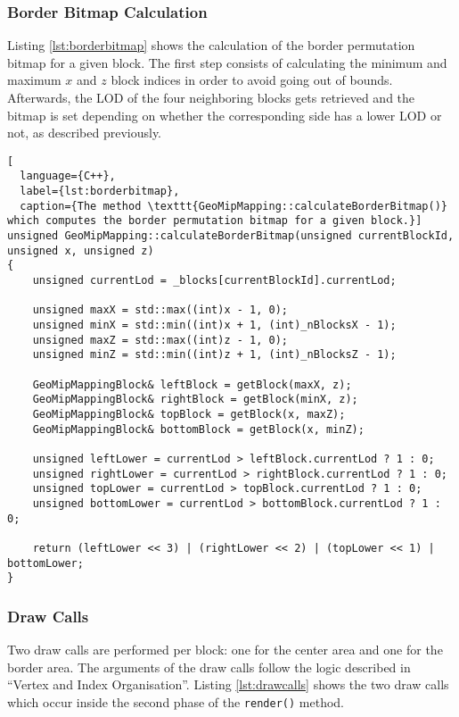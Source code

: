 \subsubsection{Border Bitmap Calculation}
Listing \ref{lst:borderbitmap} shows the calculation of the border permutation bitmap for a given block.
The first step consists of calculating the minimum and maximum $x$ and $z$ block indices
in order to avoid going out of bounds. Afterwards, the LOD of the four neighboring blocks
gets retrieved and the bitmap is set depending on whether the corresponding side 
has a lower LOD or not, as described previously.
\begin{lstlisting}[
  language={C++},
  label={lst:borderbitmap},
  caption={The method \texttt{GeoMipMapping::calculateBorderBitmap()} which computes the border permutation bitmap for a given block.}]
unsigned GeoMipMapping::calculateBorderBitmap(unsigned currentBlockId, unsigned x, unsigned z)
{
    unsigned currentLod = _blocks[currentBlockId].currentLod;

    unsigned maxX = std::max((int)x - 1, 0);
    unsigned minX = std::min((int)x + 1, (int)_nBlocksX - 1);
    unsigned maxZ = std::max((int)z - 1, 0);
    unsigned minZ = std::min((int)z + 1, (int)_nBlocksZ - 1);

    GeoMipMappingBlock& leftBlock = getBlock(maxX, z);
    GeoMipMappingBlock& rightBlock = getBlock(minX, z);
    GeoMipMappingBlock& topBlock = getBlock(x, maxZ);
    GeoMipMappingBlock& bottomBlock = getBlock(x, minZ);

    unsigned leftLower = currentLod > leftBlock.currentLod ? 1 : 0;
    unsigned rightLower = currentLod > rightBlock.currentLod ? 1 : 0;
    unsigned topLower = currentLod > topBlock.currentLod ? 1 : 0;
    unsigned bottomLower = currentLod > bottomBlock.currentLod ? 1 : 0;

    return (leftLower << 3) | (rightLower << 2) | (topLower << 1) | bottomLower;
}
\end{lstlisting}


\subsubsection{Draw Calls} 
Two draw calls are performed per block: one for the center area and one for the border area.
The arguments of the draw calls follow the logic described in ``Vertex and Index Organisation''.
Listing \ref{lst:drawcalls} shows the two draw calls which occur inside the second phase of the \texttt{render()} method.

